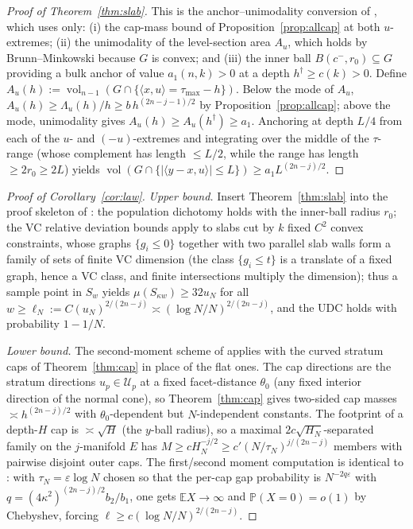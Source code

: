 \documentclass[11pt]{article}
\newcommand{\E}{\mathbb{E}}
\newcommand{\PP}{\mathbb{P}}
\newcommand{\vol}{\operatorname{vol}}
\begin{document}
\begin{proof}[Proof of Theorem~\ref{thm:slab}]
This is the anchor--unimodality conversion of \cite{companion4,companion11},
which uses only: (i) the cap-mass bound of Proposition~\ref{prop:allcap} at both
$u$-extremes; (ii) the unimodality of the level-section area $A_u$, which holds
by Brunn--Minkowski because $G$ is convex; and (iii) the inner ball
$B(c^-,r_0)\subseteq G$ providing a bulk anchor of value $a_1(n,k)>0$ at a depth
$h^\dagger\ge c(k)>0$.  Define $A_u(h):=\vol_{n-1}(G\cap\{\langle x,u\rangle
=\tau_{\max}-h\})$.  Below the mode of $A_u$, $A_u(h)\ge\Lambda_u(h)/h\ge
b\,h^{(2n-j-1)/2}$ by Proposition~\ref{prop:allcap}; above the mode,
unimodality gives $A_u(h)\ge A_u(h^\dagger)\ge a_1$.  Anchoring at depth $L/4$
from each of the $u$- and $(-u)$-extremes and integrating over the middle of the
$\tau$-range (whose complement has length $\le L/2$, while the range has length
$\ge2r_0\ge2L$) yields
$\vol(G\cap\{|\langle y-x,u\rangle|\le L\})\ge a_1 L^{(2n-j)/2}$.
\end{proof}

\begin{proof}[Proof of Corollary~\ref{cor:law}]
\emph{Upper bound.}  Insert Theorem~\ref{thm:slab} into the proof skeleton of
\cite{companion2,companion4}: the population dichotomy holds with the inner-ball
radius $r_0$; the VC relative deviation bounds apply to slabs cut by $k$ fixed
$C^2$ convex constraints, whose graphs $\{g_i\le0\}$ together with two parallel
slab walls form a family of sets of finite VC dimension (the class
$\{g_i\le t\}$ is a translate of a fixed graph, hence a VC class, and finite
intersections multiply the dimension); thus a sample point in $S_w$ yields
$\mu(S_{\kappa w})\ge32u_N$ for all $w\ge\ell_N:=C(u_N)^{2/(2n-j)}\asymp
(\log N/N)^{2/(2n-j)}$, and the UDC holds with probability $1-1/N$.

\emph{Lower bound.}  The second-moment scheme of
\cite{companion4,companion11} applies with the curved stratum caps of
Theorem~\ref{thm:cap} in place of the flat ones.  The cap directions are the
stratum directions $u_p\in\mathcal U_p$ at a fixed facet-distance $\theta_0$
(any fixed interior direction of the normal cone), so Theorem~\ref{thm:cap}
gives two-sided cap masses $\asymp h^{(2n-j)/2}$ with $\theta_0$-dependent but
$N$-independent constants.  The footprint of a depth-$H$ cap is $\asymp\sqrt H$
(the $y$-ball radius), so a maximal $2c\sqrt{H_N}$-separated family on the
$j$-manifold $E$ has $M\ge c H_N^{-j/2}\ge c'(N/\tau_N)^{j/(2n-j)}$ members with
pairwise disjoint outer caps.  The first/second moment computation is identical
to \cite{companion11}: with $\tau_N=\varepsilon\log N$ chosen so that the
per-cap gap probability is $N^{-2q\varepsilon}$ with
$q=(4\kappa^2)^{(2n-j)/2}b_2/b_1$, one gets $\E X\to\infty$ and
$\PP(X=0)=o(1)$ by Chebyshev, forcing $\ell\ge c(\log N/N)^{2/(2n-j)}$.
\end{proof}
\end{document}
